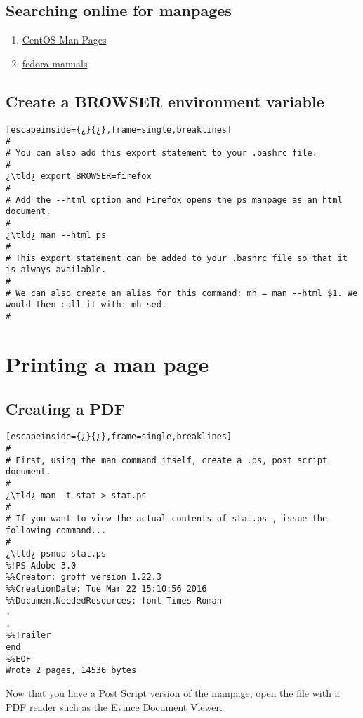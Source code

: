 \subsection{Searching online for manpages}

\begin{enumerate}
	\item{\href{http://grisha.biz/cgi-bin/man}{CentOS Man Pages}}
	\item{\href{http://linuxmanpages.net/index.html}{fedora manuals}}
\end{enumerate}

\subsection{Create a BROWSER environment variable}

\begin{lstlisting}[escapeinside={¿}{¿},frame=single,breaklines]
#
# You can also add this export statement to your .bashrc file.
#
¿\tld¿ export BROWSER=firefox
#
# Add the --html option and Firefox opens the ps manpage as an html document.
#
¿\tld¿ man --html ps
#
# This export statement can be added to your .bashrc file so that it is always available.
#
# We can also create an alias for this command: mh = man --html $1. We would then call it with: mh sed.
#
\end{lstlisting}

\section{Printing a man page}

\subsection{Creating a PDF}

\begin{lstlisting}[escapeinside={¿}{¿},frame=single,breaklines]
#
# First, using the man command itself, create a .ps, post script document.
#
¿\tld¿ man -t stat > stat.ps
#
# If you want to view the actual contents of stat.ps , issue the following command...
#
¿\tld¿ psnup stat.ps
%!PS-Adobe-3.0
%%Creator: groff version 1.22.3
%%CreationDate: Tue Mar 22 15:10:56 2016
%%DocumentNeededResources: font Times-Roman
.
.
%%Trailer
end
%%EOF
Wrote 2 pages, 14536 bytes
\end{lstlisting}

Now that you have a Post Script version of the manpage, open the file with a PDF reader such as the \href{https://help.gnome.org/users/evince/stable/}{Evince Document Viewer}.

